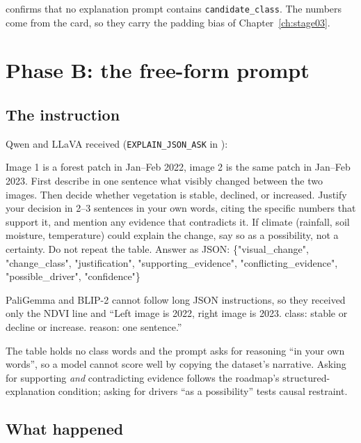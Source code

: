  confirms that no explanation prompt contains \texttt{candidate\_class}. The numbers come from the card, so they carry the padding bias of Chapter~\ref{ch:stage03}.

\section{Phase B: the free-form prompt}

\subsection{The instruction}

Qwen and LLaVA received (\texttt{EXPLAIN\_JSON\_ASK} in ):

\begin{tcolorbox}[colback=gray!4,colframe=gray!50,fontupper=\scriptsize]
Image 1 is a forest patch in Jan--Feb 2022, image 2 is the same patch in Jan--Feb 2023. First describe in one sentence what visibly changed between the two images. Then decide whether vegetation is stable, declined, or increased. Justify your decision in 2--3 sentences in your own words, citing the specific numbers that support it, and mention any evidence that contradicts it. If climate (rainfall, soil moisture, temperature) could explain the change, say so as a possibility, not a certainty. Do not repeat the table. Answer as JSON: \{"visual\_change", "change\_class", "justification", "supporting\_evidence", "conflicting\_evidence", "possible\_driver", "confidence"\}
\end{tcolorbox}

PaliGemma and BLIP-2 cannot follow long JSON instructions, so they received only the NDVI line and ``Left image is 2022, right image is 2023. class: stable or decline or increase. reason: one sentence.''

\begin{whybox}
The table holds no class words and the prompt asks for reasoning ``in your own words'', so a model cannot score well by copying the dataset's narrative. Asking for supporting \emph{and} contradicting evidence follows the roadmap's structured-explanation condition; asking for drivers ``as a possibility'' tests causal restraint.
\end{whybox}

\subsection{What happened}

